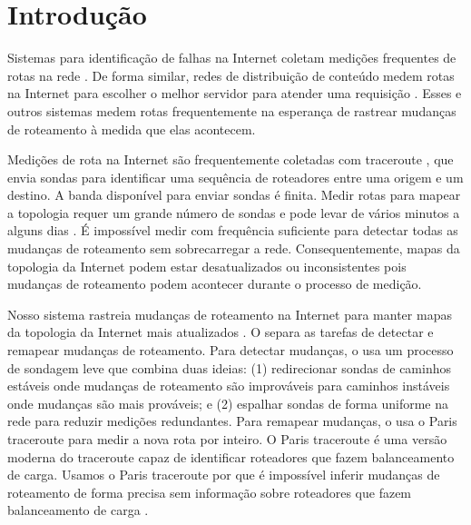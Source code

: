 \section{Introdução}
\label{sec:intro}

Sistemas para identificação de falhas na Internet coletam medições
frequentes de rotas na rede \cite{duffield06binary,
dhamdhere07netdiagnoser, kompella07blackholes, bassett12lifeguard}.  De
forma similar, redes de distribuição de conteúdo medem rotas na Internet
para escolher o melhor servidor para atender uma requisição
\cite{akamai}.  Esses e outros sistemas medem rotas frequentemente na
esperança de rastrear mudanças de roteamento à medida que elas
acontecem.  

Medições de rota na Internet são frequentemente coletadas com traceroute
\cite{jacobson1989traceroute, augustin07, veitch09balancer}, que envia
sondas para identificar uma sequência de roteadores entre uma origem e
um destino.  A banda disponível para enviar sondas é finita.  Medir
rotas para mapear a topologia requer um grande número de sondas e pode
levar de vários minutos a alguns dias \cite{cunha11fastmapping,
sherwood08discarte, skitter}.  É impossível medir com frequência
suficiente para detectar todas as mudanças de roteamento sem
sobrecarregar a rede.  Consequentemente, mapas da topologia da Internet
podem estar desatualizados ou inconsistentes pois mudanças de roteamento
podem acontecer durante o processo de medição.

Nosso sistema \dtrack{} rastreia mudanças de roteamento na Internet para
manter mapas da topologia da Internet mais atualizados
\cite{cunha11dtrack}.  O \dtrack{} separa as tarefas de detectar e
remapear mudanças de roteamento.  Para detectar mudanças, o \dtrack{}
usa um processo de sondagem leve que combina duas ideias: (1)
redirecionar sondas de caminhos estáveis onde mudanças de roteamento são
improváveis para caminhos instáveis onde mudanças são mais prováveis; e
(2) espalhar sondas de forma uniforme na rede para reduzir medições
redundantes.  Para remapear mudanças, o \dtrack{} usa o Paris traceroute
\cite{augustin07, veitch09balancer} para medir a nova rota por inteiro.
O Paris traceroute é uma versão moderna do traceroute capaz de
identificar roteadores que fazem balanceamento de carga.  Usamos o Paris
traceroute por que é impossível inferir mudanças de roteamento de forma
precisa sem informação sobre roteadores que fazem balanceamento de carga
\cite{cunha11fastmapping}.

